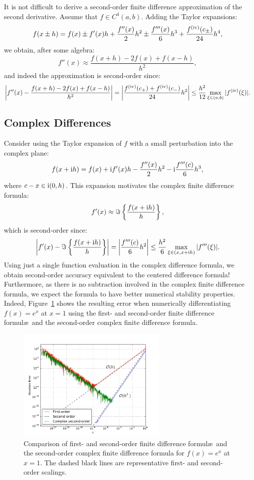 It is not difficult to derive a second-order finite difference approximation of the second derivative. Assume that $f\in C^4(a,b)$. Adding the Taylor expansions:
\[
f(x\pm h) = f(x) \pm f'(x)h + \dfrac{f''(x)}{2}h^2 \pm \dfrac{f'''(x)}{6}h^3 + \dfrac{f^{({\rm iv})}(c_\pm)}{24}h^4,
\]
we obtain, after some algebra:
\[
f''(x) \approx \dfrac{f(x+h)-2f(x) + f(x-h)}{h^2},
\]
and indeed the approximation is second-order since:
\[
\left|f''(x) - \dfrac{f(x+h)-2f(x) + f(x-h)}{h^2}\right| = \left|\dfrac{f^{({\rm iv})}(c_+) + f^{({\rm iv})}(c_-)}{24}h^2\right| \le \dfrac{h^2}{12}\max_{\xi\in(a,b)}|f^{({\rm iv})}(\xi)|.
\]

\subsection{Complex Differences}

Consider using the Taylor expansion of $f$ with a small perturbation into the complex plane:
\[
f(x+{\rm i} h) = f(x) + {\rm i} f'(x)h - \dfrac{f''(x)}{2}h^2 - {\rm i}\dfrac{f'''(c)}{6}h^3,
\]
where $c-x\in{\rm i}(0,h)$. This expansion motivates the complex finite difference formula:
\[
f'(x) \approx \Im\left\{\dfrac{f(x+{\rm i} h)}{h}\right\},
\]
which is second-order since:
\[
\left|f'(x) - \Im\left\{\dfrac{f(x+{\rm i} h)}{h}\right\}\right| = \left|\dfrac{f'''(c)}{6}h^2\right| \le \dfrac{h^2}{6}\max_{\xi\in(x,x+{\rm i} h)}|f'''(\xi)|.
\]
Using just a single function evaluation in the complex difference formula, we obtain second-order accuracy equivalent to the centered difference formula! Furthermore, as there is no subtraction involved in the complex finite difference formula, we expect the formula to have better numerical stability properties. Indeed, Figure~\ref{figure:FiniteDifferences} shows the resulting error when numerically differentiating $f(x) = e^x$ at $x=1$ using the first- and second-order finite difference formul\ae~and the second-order complex finite difference formula.

\begin{figure}[htbp]
\begin{center}
\includegraphics[width=0.65\textwidth]{finitedifferences}
\caption{Comparison of first- and second-order finite difference formul\ae~and the second-order complex finite difference formula for $f(x)=e^x$ at $x=1$. The dashed black lines are representative first- and second-order scalings.}
\label{figure:FiniteDifferences}
\end{center}
\end{figure}

